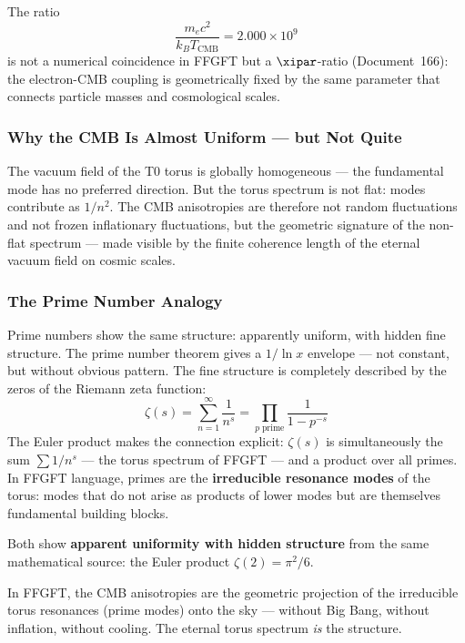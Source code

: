 \begin{foundation}
The ratio
\begin{equation}
    \frac{m_e c^2}{k_B T_\text{CMB}} = 2.000 \times 10^9
\end{equation}
is not a numerical coincidence in FFGFT but a $\xipar$-ratio (Document~166):
the electron-CMB coupling is geometrically fixed by the same parameter
that connects particle masses and cosmological scales.
\end{foundation}

\subsubsection*{Why the CMB Is Almost Uniform — but Not Quite}

The vacuum field of the T0 torus is globally homogeneous — the fundamental
mode has no preferred direction. But the torus spectrum is not flat: modes
contribute as $1/n^2$. The CMB anisotropies are therefore not random
fluctuations and not frozen inflationary fluctuations, but the geometric
signature of the non-flat spectrum — made visible by the finite coherence
length of the eternal vacuum field on cosmic scales.

\subsubsection*{The Prime Number Analogy}

Prime numbers show the same structure: apparently uniform, with hidden
fine structure. The prime number theorem gives a $1/\ln x$ envelope —
not constant, but without obvious pattern. The fine structure is completely
described by the zeros of the Riemann zeta function:
\begin{equation}
    \zeta(s) = \sum_{n=1}^{\infty} \frac{1}{n^s}
    = \prod_{p\;\text{prime}} \frac{1}{1-p^{-s}}
\end{equation}
The Euler product makes the connection explicit: $\zeta(s)$ is
simultaneously the sum $\sum 1/n^s$ — the torus spectrum of FFGFT —
and a product over all primes. In FFGFT language, primes are the
\textbf{irreducible resonance modes} of the torus: modes that do not
arise as products of lower modes but are themselves fundamental building
blocks.

\begin{interpretation}
Both show \textbf{apparent uniformity with hidden structure} from the
same mathematical source: the Euler product $\zeta(2) = \pi^2/6$.

In FFGFT, the CMB anisotropies are the geometric projection of the
irreducible torus resonances (prime modes) onto the sky — without Big
Bang, without inflation, without cooling. The eternal torus spectrum
\emph{is} the structure.
\end{interpretation}

